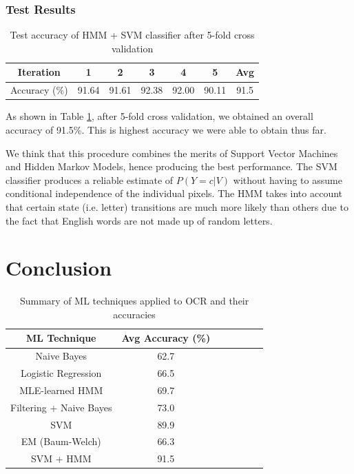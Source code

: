 \documentclass{article} %
\begin{document}
\subsubsection{Test Results}

\begin{table}[h]
\centering
\begin{tabular}{|c|c|c|c|c|c|c|}
\hline
Iteration & 1 & 2 & 3 & 4 & 5 & Avg \\
\hline 
Accuracy (\%) & 91.64 & 91.61 & 92.38 & 92.00 & 90.11 & 91.5 \\
\hline 
\end{tabular}
\caption{Test accuracy of HMM + SVM classifier after 5-fold cross validation}
\label{tab:hmm-svm-cross-val}
\end{table}

As shown in Table \ref{tab:hmm-svm-cross-val}, after 5-fold cross validation, we obtained an overall accuracy of 91.5\%. This is highest accuracy we were able to obtain thus far.

We think that this procedure combines the merits of Support Vector Machines and Hidden Markov Models, hence producing the best performance. The SVM classifier produces a reliable estimate of $P(Y=c|V)$ without having to assume conditional independence of the individual pixels. The HMM takes into account that certain state (i.e. letter) transitions are much more likely than others due to the fact that English words are not made up of random letters.

\section{Conclusion}

\begin{table}[H]
\centering
\begin{tabular}{|c|c|c|c|c|c|c|}
\hline
ML Technique & Avg Accuracy (\%) \\
\hline 
Naive Bayes & 62.7 \\
Logistic Regression & 66.5 \\
\hline 
MLE-learned HMM & 69.7 \\
Filtering + Naive Bayes & 73.0 \\
SVM & 89.9 \\
\hline 
EM (Baum-Welch) & 66.3 \\
SVM + HMM & 91.5 \\
\hline 
\end{tabular}
\caption{Summary of ML techniques applied to OCR and their accuracies}
\label{tab:summary-ml-tech}
\end{table}
\end{document}
